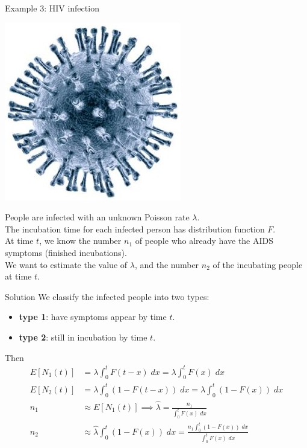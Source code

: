 \documentclass[mathserif]{beamer}
\begin{document}
\begin{frame}{Example 3: HIV infection}
\begin{center}
\includegraphics[scale=0.25]{hiv.jpg}
\end{center}
People are infected with an unknown Poisson rate $\lambda$.\\
The incubation time for each infected person has distribution function $F$.\\
At time $t$, we know the number $n_1$ of people who already have the AIDS symptoms (finished incubations).\\
We want to estimate the value of $\lambda$, and the number $n_2$ of the incubating people at time $t$.
\end{frame}

\begin{frame}{Solution}
We classify the infected people into two types:
\begin{itemize}
\item \textbf{type 1}: have symptoms appear by time $t$.
\item \textbf{type 2}: still in incubation by time $t$.
\end{itemize}
Then
\begin{align*}
E[N_1(t)] & = \lambda\int_0^t F(t-x)\;dx = \lambda\int_0^t F(x)\;dx \\
E[N_2(t)] & = \lambda\int_0^t (1-F(t-x))\;dx = \lambda\int_0^t (1-F(x))\;dx \\
n_1 & \approx E[N_1(t)] \implies \hat{\lambda} = \frac{n_1}{\int_0^t F(x)\;dx} \\
n_2 & \approx \hat{\lambda}\int_0^t (1-F(x))\;dx = \frac{n_1\int_0^t (1-F(x))\;dx}{\int_0^t F(x)\;dx}
\end{align*}
\end{frame}
\end{document}
